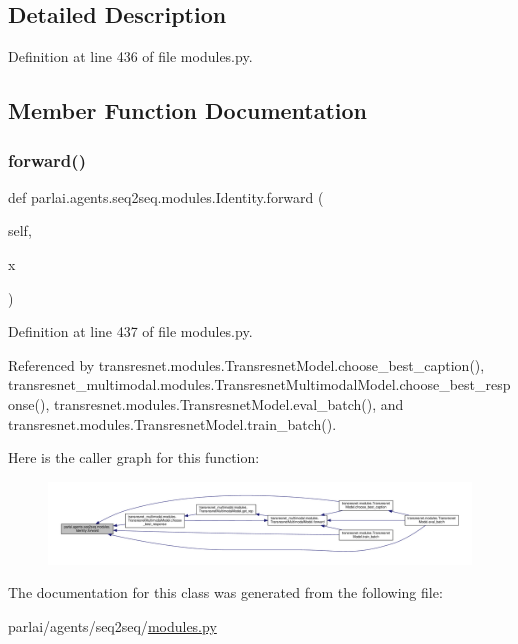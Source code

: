 \subsection{Detailed Description}


Definition at line 436 of file modules.\+py.



\subsection{Member Function Documentation}
\mbox{\label{classparlai_1_1agents_1_1seq2seq_1_1modules_1_1Identity_ab606c0becf72eba3f6453fd5a551aef3}} 
\subsubsection{\texorpdfstring{forward()}{forward()}}
{\footnotesize\ttfamily def parlai.\+agents.\+seq2seq.\+modules.\+Identity.\+forward (\begin{DoxyParamCaption}\item[{}]{self,  }\item[{}]{x }\end{DoxyParamCaption})}



Definition at line 437 of file modules.\+py.



Referenced by transresnet.\+modules.\+Transresnet\+Model.\+choose\+\_\+best\+\_\+caption(), transresnet\+\_\+multimodal.\+modules.\+Transresnet\+Multimodal\+Model.\+choose\+\_\+best\+\_\+response(), transresnet.\+modules.\+Transresnet\+Model.\+eval\+\_\+batch(), and transresnet.\+modules.\+Transresnet\+Model.\+train\+\_\+batch().

Here is the caller graph for this function\+:
\nopagebreak
\begin{figure}[H]
\begin{center}
\leavevmode
\includegraphics[width=350pt]{classparlai_1_1agents_1_1seq2seq_1_1modules_1_1Identity_ab606c0becf72eba3f6453fd5a551aef3_icgraph}
\end{center}
\end{figure}


The documentation for this class was generated from the following file\+:\begin{DoxyCompactItemize}
\item 
parlai/agents/seq2seq/\hyperlink{parlai_2agents_2seq2seq_2modules_8py}{modules.\+py}\end{DoxyCompactItemize}
